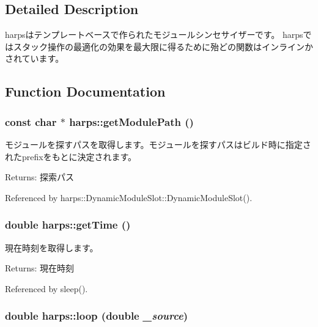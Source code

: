 \subsection{Detailed Description}
harpsはテンプレートベースで作られたモジュールシンセサイザーです。 harpsではスタック操作の最適化の効果を最大限に得るために殆どの関数はインラインかされています。 

\subsection{Function Documentation}
\subsubsection[getModulePath]{\setlength{\rightskip}{0pt plus 5cm}const char $\ast$ harps::getModulePath ()}\label{namespaceharps_39a98007c1da8f7aedcfe13c51760124}


モジュールを探すパスを取得します。モジュールを探すパスはビルド時に指定されたprefixをもとに決定されます。 \begin{Desc}
\item[Returns:]探索パス \end{Desc}


Referenced by harps::DynamicModuleSlot::DynamicModuleSlot().
\subsubsection[getTime]{\setlength{\rightskip}{0pt plus 5cm}double harps::getTime ()\hspace{0.3cm}{\tt  [inline]}}\label{namespaceharps_54146ea57c1846a470bf191f51516988}


現在時刻を取得します。 \begin{Desc}
\item[Returns:]現在時刻 \end{Desc}


Referenced by sleep().
\subsubsection[loop]{\setlength{\rightskip}{0pt plus 5cm}double harps::loop (double {\em \_\-source})\hspace{0.3cm}{\tt  [inline]}}\label{namespaceharps_cb6eb6b6be744624501519370f1973ed}


